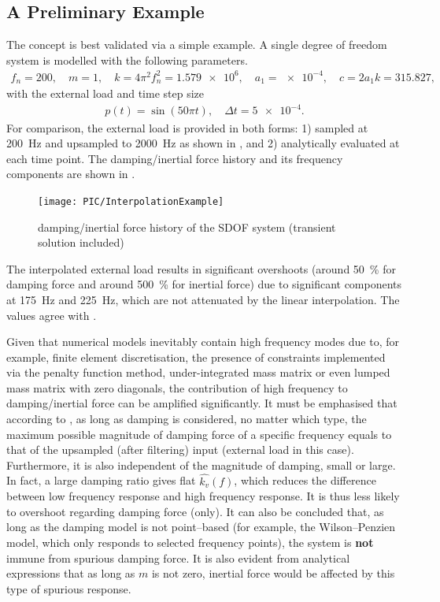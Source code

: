 \subsection{A Preliminary Example}
The concept is best validated via a simple example. A single degree of freedom system is modelled with the following parameters.
\begin{gather}
f_n=200,\quad{}m=1,\quad{}k=4\pi^2f_n^2=\num{1.579e6},\quad{}a_1=\num{e-4},\quad{}c=2a_1k=\num{315.827},
\end{gather}
with the external load and time step size
\begin{gather}
p\left(t\right)=\sin\left(50\pi{}t\right),\quad\Delta{}t=\num{5e-4}.
\end{gather}
For comparison, the external load is provided in both forms: 1) sampled at \SI{200}{\hertz} and upsampled to \SI{2000}{\hertz} as shown in , and 2) analytically evaluated at each time point. The damping/inertial force history and its frequency components are shown in .
\begin{figure}[htb!]
\centering
\texttt{[image: PIC/InterpolationExample]}
\caption{damping/inertial force history of the SDOF system (transient solution included)}\label{fig:sdof_force}
\end{figure}
The interpolated external load results in significant overshoots (around \SI{50}{\percent} for damping force and around \SI{500}{\percent} for inertial force) due to significant components at \SI{175}{\hertz} and \SI{225}{\hertz}, which are not attenuated by the linear interpolation. The values agree with .

Given that numerical models inevitably contain high frequency modes due to, for example, finite element discretisation, the presence of constraints implemented via the penalty function method, under-integrated mass matrix or even lumped mass matrix with zero diagonals, the contribution of high frequency to damping/inertial force can be amplified significantly. It must be emphasised that according to , as long as damping is considered, no matter which type, the maximum possible magnitude of damping force of a specific frequency equals to that of the upsampled (after filtering) input (external load in this case). Furthermore, it is also independent of the magnitude of damping, small or large. In fact, a large damping ratio gives flat $\hat{k_v}\left(f\right)$, which reduces the difference between low frequency response and high frequency response. It is thus less likely to overshoot regarding damping force (only). It can also be concluded that, as long as the damping model is not point--based (for example, the Wilson--Penzien model, which only responds to selected frequency points), the system is \textbf{not} immune from spurious damping force. It is also evident from analytical expressions that as long as $m$ is not zero, inertial force would be affected by this type of spurious response.

